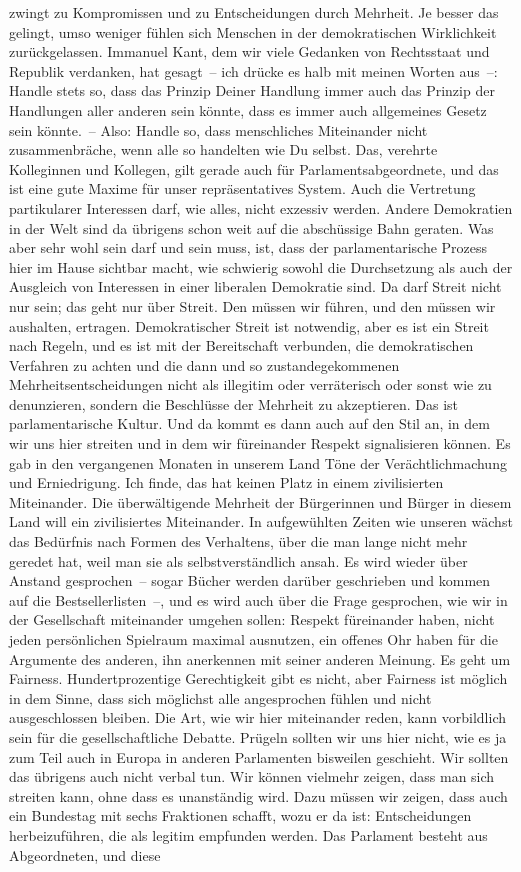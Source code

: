 \documentclass[10pt, a4paper]{report}
\begin{document}
zwingt zu Kompromissen und zu Entscheidungen durch Mehrheit. Je besser das gelingt, umso weniger fühlen sich Menschen in der demokratischen Wirklichkeit zurückgelassen. Immanuel Kant, dem wir viele Gedanken von Rechtsstaat und Republik verdanken, hat gesagt – ich drücke es halb mit meinen Worten aus –: Handle stets so, dass das Prinzip Deiner Handlung immer auch das Prinzip der Handlungen aller anderen sein könnte, dass es immer auch allgemeines Gesetz sein könnte. – Also: Handle so, dass menschliches Miteinander nicht zusammenbräche, wenn alle so handelten wie Du selbst. Das, verehrte Kolleginnen und Kollegen, gilt gerade auch für Parlamentsabgeordnete, und das ist eine gute Maxime für unser repräsentatives System. Auch die Vertretung partikularer Interessen darf, wie alles, nicht exzessiv werden. Andere Demokratien in der Welt sind da übrigens schon weit auf die abschüssige Bahn geraten. Was aber sehr wohl sein darf und sein muss, ist, dass der parlamentarische Prozess hier im Hause sichtbar macht, wie schwierig sowohl die Durchsetzung als auch der Ausgleich von Interessen in einer liberalen Demokratie sind. Da darf Streit nicht nur sein; das geht nur über Streit. Den müssen wir führen, und den müssen wir aushalten, ertragen. Demokratischer Streit ist notwendig, aber es ist ein Streit nach Regeln, und es ist mit der Bereitschaft verbunden, die demokratischen Verfahren zu achten und die dann und so zustandegekommenen Mehrheitsentscheidungen nicht als illegitim oder verräterisch oder sonst wie zu denunzieren, sondern die Beschlüsse der Mehrheit zu akzeptieren. Das ist parlamentarische Kultur. Und da kommt es dann auch auf den Stil an, in dem wir uns hier streiten und in dem wir füreinander Respekt signalisieren können. Es gab in den vergangenen Monaten in unserem Land Töne der Verächtlichmachung und Erniedrigung. Ich finde, das hat keinen Platz in einem zivilisierten Miteinander. Die überwältigende Mehrheit der Bürgerinnen und Bürger in diesem Land will ein zivilisiertes Miteinander. In aufgewühlten Zeiten wie unseren wächst das Bedürfnis nach Formen des Verhaltens, über die man lange nicht mehr geredet hat, weil man sie als selbstverständlich ansah. Es wird wieder über Anstand gesprochen – sogar Bücher werden darüber geschrieben und kommen auf die Bestsellerlisten –, und es wird auch über die Frage gesprochen, wie wir in der Gesellschaft miteinander umgehen sollen: Respekt füreinander haben, nicht jeden persönlichen Spielraum maximal ausnutzen, ein offenes Ohr haben für die Argumente des anderen, ihn anerkennen mit seiner anderen Meinung. Es geht um Fairness. Hundertprozentige Gerechtigkeit gibt es nicht, aber Fairness ist möglich in dem Sinne, dass sich möglichst alle angesprochen fühlen und nicht ausgeschlossen bleiben. Die Art, wie wir hier miteinander reden, kann vorbildlich sein für die gesellschaftliche Debatte. Prügeln sollten wir uns hier nicht, wie es ja zum Teil auch in Europa in anderen Parlamenten bisweilen geschieht. Wir sollten das übrigens auch nicht verbal tun. Wir können vielmehr zeigen, dass man sich streiten kann, ohne dass es unanständig wird. Dazu müssen wir zeigen, dass auch ein Bundestag mit sechs Fraktionen schafft, wozu er da ist: Entscheidungen herbeizuführen, die als legitim empfunden werden. Das Parlament besteht aus Abgeordneten, und diese 
\end{document}
